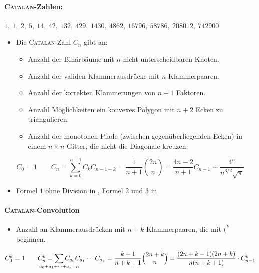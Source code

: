     \begin{methods}
	\end{methods}

\paragraph{\textsc{Catalan}-Zahlen:}
$1,~1,~2,~5,~14,~42,~132,~429,~1430,~4862,~16796,~58786,~208012,~742900$
\begin{itemize}
	\item Die \textsc{Catalan}-Zahl $C_n$ gibt an:
	\begin{itemize}
		\item Anzahl der Binärbäume mit $n$ nicht unterscheidbaren Knoten.
		\item Anzahl der validen Klammerausdrücke mit $n$ Klammerpaaren.
		\item Anzahl der korrekten Klammerungen von $n+1$ Faktoren.
		\item Anzahl Möglichkeiten ein konvexes Polygon mit $n + 2$ Ecken zu triangulieren.
		\item Anzahl der monotonen Pfade (zwischen gegenüberliegenden Ecken) in
		einem $n \times n$-Gitter, die nicht die Diagonale kreuzen.
	\end{itemize}
\end{itemize}
\[C_0 = 1\qquad C_n = \sum\limits_{k = 0}^{n - 1} C_kC_{n - 1 - k} =
\frac{1}{n + 1}\binom{2n}{n} = \frac{4n - 2}{n+1} C_{n-1} \sim \frac{4^n}{n^{3/2} \sqrt{\pi}}\]
\begin{itemize}
	\item Formel $1$ ohne Division in , Formel $2$ und $3$ in 
\end{itemize}

\paragraph{\textsc{Catalan}-Convolution}
\begin{itemize}
	\item Anzahl an Klammerausdrücken mit $n+k$ Klammerpaaren, die mit $\texttt{(}^k$ beginnen.
\end{itemize}
\[C^k_0 = 1\qquad C^k_n = \sum\limits_{\mathclap{a_0+a_1+\dots+a_k=n}} C_{a_0}C_{a_1}\cdots C_{a_k} =
\frac{k+1}{n+k+1}\binom{2n+k}{n} = \frac{(2n+k-1)(2n+k)}{n(n+k+1)} \cdot C^k_{n-1}\]

